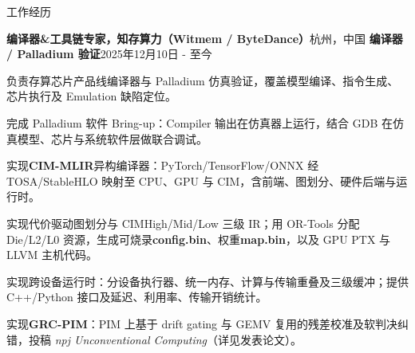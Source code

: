 \documentclass{resume} %
\begin{document}
\begin{rSection}{工作经历}

\begin{rSubsection}{\textbf{编译器\&工具链专家，知存算力（Witmem / ByteDance）}}{杭州，中国}
{\textbf{编译器 / Palladium 验证}}{2025年12月10日 - 至今}
\item {负责存算芯片产品线编译器与 Palladium 仿真验证，覆盖模型编译、指令生成、芯片执行及 Emulation 缺陷定位。}\\
\item {完成 Palladium 软件 Bring-up：Compiler 输出在仿真器上运行，结合 GDB 在仿真模型、芯片与系统软件层做联合调试。}\\
\item {实现{\textbf{CIM-MLIR}}异构编译器：PyTorch/TensorFlow/ONNX 经 TOSA/StableHLO 映射至 CPU、GPU 与 CIM，含前端、图划分、硬件后端与运行时。}\\
\item {实现代价驱动图划分与 CIMHigh/Mid/Low 三级 IR；用 OR-Tools 分配 Die/L2/L0 资源，生成可烧录{\textbf{config.bin}}、权重{\textbf{map.bin}}，以及 GPU PTX 与 LLVM 主机代码。}\\
\item {实现跨设备运行时：分设备执行器、统一内存、计算与传输重叠及三级缓冲；提供 C++/Python 接口及延迟、利用率、传输开销统计。}\\
\item {实现{\textbf{GRC-PIM}}：PIM 上基于 drift gating 与 GEMV 复用的残差校准及软判决纠错，投稿 {\textit{npj Unconventional Computing}}（详见发表论文）。}\\
\end{rSubsection}


\end{rSection}
\end{document}
